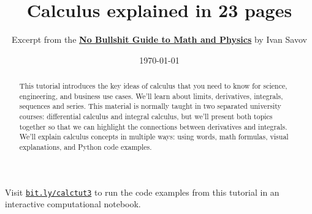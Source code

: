 \documentclass[10pt]{IEEEtran}
\title{{\Huge Calculus explained in 23 pages}}
\author{Excerpt from the \href{http://minireference.com/}{\textbf{No Bullshit Guide to Math and Physics}} by Ivan Savov \vspace*{-6mm}}
\date{\today}
\def\tt{\texttt}
\def\tt{\texttt}
\begin{document}
\makeatletter
\preto{\@verbatim}{\topsep=0pt \partopsep=0pt \vspace{-1.2mm}}
\makeatother




        \maketitle


\begin{abstract}
	This tutorial introduces the key ideas of calculus
	that you need to know for science, engineering, and business use cases.
	We'll learn about limits, derivatives, integrals, sequences and series.
	This material is normally taught in two separated university courses:
	differential calculus and integral calculus,
	but we'll present both topics together
	so that we can highlight the connections between derivatives and integrals.
	We'll explain calculus concepts in multiple ways:
	using words, math formulas, visual explanations,
	and Python code examples.
\end{abstract}




\vspace{2mm}

\tableofcontents

%



\vfill

\noindent
Visit \href{https://bit.ly/calctut3}{\tt{bit.ly/calctut3}}
to run the code examples from this tutorial in an interactive computational notebook.
	
\clearpage

% 


% 
\bigskip	%
\bigskip	%

\end{document}
